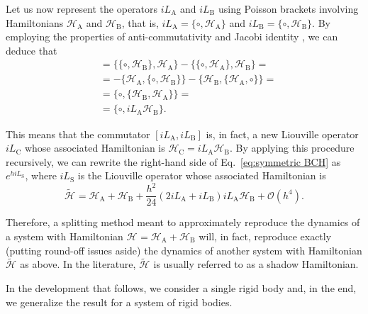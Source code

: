 \documentclass[
journal=jctcce,
layout=twocolumn
]{achemso}
\newcommand{\Ham}[1]{{\mathcal H}_\text{#1}}    %
\newcommand{\Liu}[1]{i\!L_\text{#1}}            %
\newcommand{\timestep}{h}
\newcommand{\modified}[1]{\widetilde{#1}}
\begin{document}
Let us now represent the operators $\Liu A$ and $\Liu B$ using Poisson brackets involving Hamiltonians $\Ham A$ and $\Ham B$, that is, $\Liu A = \{\circ,\Ham A\}$ and $\Liu B = \{\circ,\Ham B\}$.
By employing the properties of anti-commutativity and Jacobi identity \cite{Hairer_2006}, we can deduce that
\begin{align*}
[\Liu A,\Liu B] &= \{\{\circ,\Ham B\},\Ham A\} - \{\{\circ,\Ham A\},\Ham B\} = \\
&= -\{\Ham A,\{\circ,\Ham B\}\} - \{\Ham B,\{\Ham A,\circ\}\} = \\
&= \{\circ,\{\Ham B,\Ham A\}\} = \\
&= \{\circ,{\Liu A} {\Ham B}\}.
\end{align*}

This means that the commutator $[\Liu A,\Liu B]$ is, in fact, a new Liouville operator $\Liu C$ whose associated Hamiltonian is $\Ham C = {\Liu A}{\Ham B}$.
By applying this procedure recursively, we can rewrite the right-hand side of Eq.~\eqref{eq:symmetric BCH} as $e^{\timestep \Liu S}$, where $\Liu S$ is the Liouville operator whose associated Hamiltonian is
\begin{equation*}
\label{eq:general shadow hamiltonian}
\modified{\Ham{}} = \Ham A + \Ham B + \frac{h^2}{24} (2 \Liu A + \Liu B){\Liu A}{\Ham B} + \mathcal{O}(h^4).
\end{equation*}

Therefore, a splitting method meant to approximately reproduce the dynamics of a system with Hamiltonian $\Ham{} = \Ham A + \Ham B$ will, in fact, reproduce exactly (putting round-off issues aside) the dynamics of another system with Hamiltonian $\modified{\Ham{}}$ as above.
In the literature, $\modified{\Ham{}}$ is usually referred to as a shadow Hamiltonian.

In the development that follows, we consider a single rigid body and, in the end, we generalize the result for a system of rigid bodies.
\end{document}
